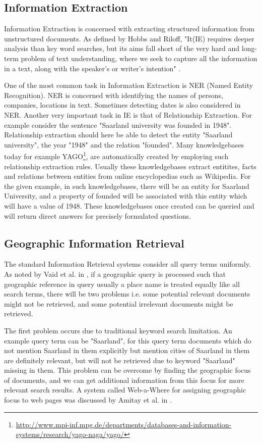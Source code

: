 \documentclass[
     11pt,         %
     a4paper,      %
     oneside,
     ]{article}
\begin{document}
\subsection{Information Extraction}
Information Extraction is concerned with extracting structured information from unstructured documents. As defined by Hobbs and Riloff, "It(IE) requires deeper analysis than  key word searches, but its aims fall short of the very hard and long-term problem of text understanding, where we seek to capture all the information in a text, along with the speaker's or writer's intention" \cite{hobbs-handbook10}.

One of the most common task in Information Extraction is NER (Named Entity Recognition). NER is concerned with identifying the names of persons, companies, locations in text. Sometimes detecting dates is also considered in NER. Another very important task in IE is that of Relationship Extraction. For example consider the sentence "Saarland university was founded in 1948". Relationship extraction should here be able to detect the entity "Saarland university", the year "1948" and the relation "founded". Many knowledgebases today for example YAGO\footnote{\url{http://www.mpi-inf.mpg.de/departments/databases-and-information-systems/research/yago-naga/yago/}}, are automatically created by employing such relationship extraction rules. Usually these knowledgebases extract entitites, facts and relations between entities from online encyclopedias such as Wikipedia. For the given example, in such knowledgebases, there will be an entity for Saarland University, and a property of founded will be associated with this entity which will have a value of 1948. These knowledgebases once created can be queried and will return direct answers for precisely formulated questions.
\subsection{Geographic Information Retrieval}
The standard Information Retrieval systems consider all query terms uniformly. As noted by Vaid et al. in \cite{Vaid:2005:SIG:2156226.2156244}, if a geographic query is processed such that geographic reference in query usually a place name is treated equally like all search terms, there will be two problems i.e. some potential relevant documents might not be retrieved, and some potential irrelevant documents might be retrieved. 

The first problem occurs due to traditional keyword search limitation. An example query term can be "Saarland", for this query term  documents which do not mention Saarland in them explicitly but mention cities of Saarland in them are definitely relevant, but will not be retrieved due to keyword "Saarland" missing in them. This problem can be overcome by finding the geographic focus of documents, and we can get additional information from this focus for more relevant search results. A system called Web-a-Where for assigning geographic focus to web pages was discussed by Amitay et al. in \cite{Amitay:2004:WGW:1008992.1009040}. 
\end{document}
